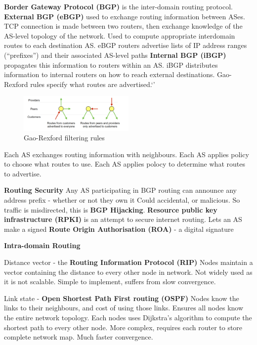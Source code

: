 \documentclass{article}
\begin{document}
\textbf{Border Gateway Protocol (BGP)} is the inter-domain routing protocol.
\textbf{External BGP (eBGP)} used to exchange routing information between ASes.
TCP connection is made between two routers, then exchange knowledge of the AS-level topology of the network.
Used to compute appropriate interdomain routes to each destination AS\@.
eBGP routers advertise lists of IP address ranges (“prefixes”) and their associated AS-level paths
\textbf{Internal BGP (iBGP)} propagates this information to routers within an AS\@.
iBGP distributes information to internal routers on how to reach external destinations.
Gao-Rexford rules specify what routes are advertised.`'

\begin{figure}[h]
    \centering
    \includegraphics[width=0.5\textwidth]{assets/gao-rexford-filtering-rules.png}
    \caption{Gao-Rexford filtering rules}
    \label{fig:gao-rexford}
\end{figure}

Each AS exchanges routing information with neighbours.
Each AS applies policy to choose what routes to use.
Each AS applies polocy to determine what routes to advertise.

\vspace{\baselineskip}
\textbf{Routing Security}
Any AS participating in BGP routing can announce any address prefix {-} whether or not they own it
Could accidental, or malicious.
So traffic is misdirected, this is \textbf{BGP Hijacking}.
\textbf{Resource public key infrastructure (RPKI)} is an attempt to secure internet routing.
Lets an AS make a signed \textbf{Route Origin Authorisation (ROA)} {-} a digital signature

\vspace{\baselineskip}

\textbf{Intra-domain Routing}

Distance vector {-} the \textbf{Routing Information Protocol (RIP)}
Nodes maintain a vector containing the distance to every other node in network.
Not widely used as it is not scalable. Simple to implement, suffers from slow convergence.

Link state {-} \textbf{Open Shortest Path First routing (OSPF)}
Nodes know the links to their neighbours, and cost of using those links.
Ensures all nodes know the entire network topology.
Each nodes uses Dijkstra's algorithm to compute the shortest path to every other node.
More complex, requires each router to store complete network map. Much faster convergence.
\end{document}
